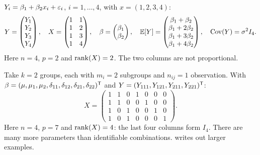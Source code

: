 \begin{example}\label{ex:L09-slr}
$Y_i=\beta_1+\beta_2x_i+\varepsilon_i$, $i=1,\dots,4$, with $x=(1,2,3,4)$:
\[
Y=\begin{pmatrix}Y_1\\Y_2\\Y_3\\Y_4\end{pmatrix},\quad
X=\begin{pmatrix}1&1\\1&2\\1&3\\1&4\end{pmatrix},\quad
\beta=\begin{pmatrix}\beta_1\\\beta_2\end{pmatrix},\quad
\mathbb E[Y]=\begin{pmatrix}\beta_1+\beta_2\\\beta_1+2\beta_2\\\beta_1+3\beta_2\\\beta_1+4\beta_2\end{pmatrix},\quad
\operatorname{Cov}(Y)=\sigma^2I_4 .
\]
Here $n=4$, $p=2$ and $\operatorname{rank}(X)=2$. The two columns are not proportional.
\end{example}

\begin{example}\label{ex:L09-nested-mat}
Take $k=2$ groups, each with $m_i=2$ subgroups and $n_{ij}=1$ observation. With
$\beta=(\mu,\mu_1,\mu_2,\delta_{11},\delta_{12},\delta_{21},\delta_{22})^{\mathsf T}$ and
$Y=(Y_{111},Y_{121},Y_{211},Y_{221})^{\mathsf T}$:
\[
X=\begin{pmatrix}
1&1&0&1&0&0&0\\
1&1&0&0&1&0&0\\
1&0&1&0&0&1&0\\
1&0&1&0&0&0&1
\end{pmatrix}.
\]
Here $n=4$, $p=7$ and $\operatorname{rank}(X)=4$: the last four columns form $I_4$. There are many more
parameters than identifiable combinations.  writes out larger examples.
\end{example}


